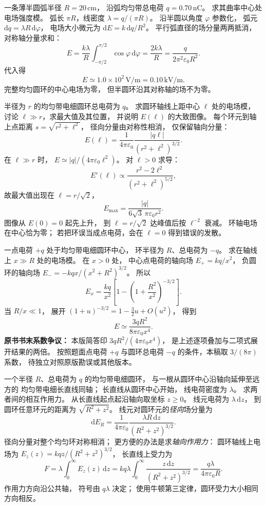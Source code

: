 一条薄半圆弧半径 $R=20\,\mathrm{cm}$，
沿弧均匀带总电荷 $q=0.70\,\mathrm{nC}$。
求其曲率中心处电场强度模。
\exsolution
弧长 $\pi R$，线密度
$\lambda=q/(\pi R)$。
沿半圆以角度 $\varphi$ 参数化，
弧元
$\mathrm dq=\lambda R\,\mathrm d\varphi$，
电场大小微元为
$\mathrm dE=k\,\mathrm dq/R^2$。
平行弧直径的场分量两两抵消，
对称轴分量求和：
\[
E=\frac{k\lambda}{R}
\int_{-\pi/2}^{\pi/2}\cos\varphi\,\mathrm d\varphi
=\frac{2k\lambda}R
=\boxed{\frac{q}{2\pi^2\varepsilon_0R^2}}.
\]
代入得
\[
\boxed{E\simeq1.0\times10^2\,\mathrm{V/m}
=0.10\,\mathrm{kV/m}}.
\]
\excheck 完整均匀圆环的中心电场为零，
但半圆环沿其对称轴的场不为零。

半径为 $r$ 的均匀带电细圆环总电荷为 $q$。
求圆环轴线上距中心 $\ell$ 处的电场模，
讨论 $\ell\gg r$，求最大值及其位置，
并说明 $E(\ell)$ 的大致图像。
\exsolution
每个环元到轴上点距离
$s=\sqrt{r^2+\ell^2}$，
径向分量由对称性相消，
仅保留轴向分量：
\[
E(\ell)=\frac{1}{4\pi\varepsilon_0}
\frac{|q\ell|}{(r^2+\ell^2)^{3/2}}.
\]
在 $\ell\gg r$ 时，
$E\simeq|q|/(4\pi\varepsilon_0\ell^2)$。
对 $\ell>0$ 求导：
\[
E'(\ell)\propto
\frac{r^2-2\ell^2}{(r^2+\ell^2)^{5/2}},
\]
故最大值出现在 $\ell=r/\sqrt2$，
\[
\boxed{E_{\max}=
\frac{|q|}{6\sqrt3\,\pi\varepsilon_0r^2}}.
\]
图像从 $E(0)=0$ 起先上升，
到 $\ell=r/\sqrt2$ 达峰值后按
$\ell^{-2}$ 衰减。
\excheck 环轴电场在中心恰为零；
若把环误当成点电荷，会在 $\ell=0$
得到错误的发散。

一点电荷 $+q$ 处于均匀带电细圆环中心，
环半径为 $R$、总电荷为 $-q$。
求在轴线上 $x\gg R$ 处的电场模。
\exsolution
在 $x>0$ 处，
中心点电荷的轴向场
$E_+=kq/x^2$，
负圆环的轴向场
$E_-=-kq x/(x^2+R^2)^{3/2}$。
所以
\[
E_x=\frac{kq}{x^2}
\left[1-\left(1+\frac{R^2}{x^2}\right)^{-3/2}\right].
\]
当 $R/x\ll1$，
展开
$(1+u)^{-3/2}=1-\frac32u+O(u^2)$，
得到
\[
\boxed{E\simeq
\frac{3qR^2}{8\pi\varepsilon_0x^4}}.
\]
\excheck \textbf{原书书末系数争议：}
本版简答印
$3qR^2/(4\pi\varepsilon_0x^4)$，
是上述逐项叠加与二项式展开结果的两倍。
按照题面点电荷 $+q$ 与圆环总电荷 $-q$
的条件，本稿取 $3/(8\pi)$ 系数，
待独立对照原版勘误或其他版本。

一个半径 $R$、总电荷为 $q$ 的均匀带电细圆环，
与一根从圆环中心沿轴向延伸至远方的
均匀带电细长直线同轴；
长直线从圆环中心开始，
线电荷密度为 $\lambda$。
求两者间的相互作用力。
\exsolution
从长直线起点起沿轴向取坐标 $z\ge0$。
线元电荷为 $\lambda\,\mathrm dz$，
到圆环任意环元的距离为
$\sqrt{R^2+z^2}$。
线元对圆环元的\emph{径向}场分量为
\[
\mathrm dE_R=
\frac1{4\pi\varepsilon_0}
\frac{\lambda R\,\mathrm dz}{(R^2+z^2)^{3/2}}.
\]
径向分量对整个均匀环对称相消；
更方便的办法是求\emph{轴向作用力}：
圆环轴线上电场为
$E_z(z)=kqz/(R^2+z^2)^{3/2}$，
长直线上受力为
\[
F=\lambda\int_0^\infty E_z(z)\,\mathrm dz
=kq\lambda
\int_0^\infty\frac{z\,\mathrm dz}{(R^2+z^2)^{3/2}}
=\boxed{\frac{q\lambda}{4\pi\varepsilon_0R}}.
\]
\excheck 作用力方向沿公共轴，
符号由 $q\lambda$ 决定；
使用牛顿第三定律，圆环受力大小相同方向相反。

